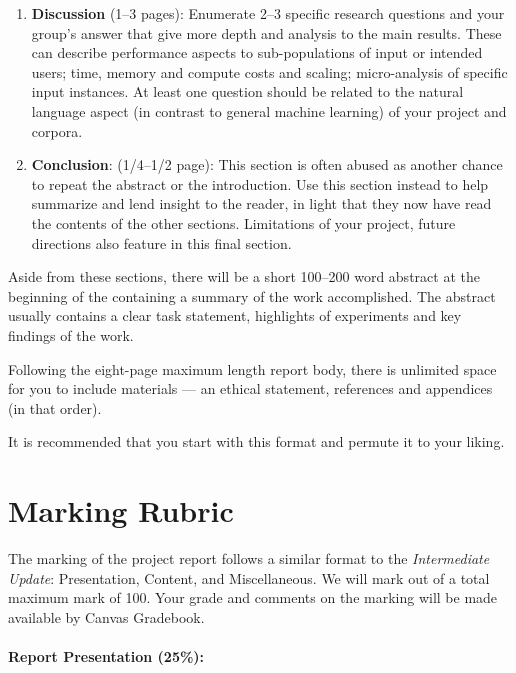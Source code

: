 \documentclass[11pt]{article}
\begin{document}
\begin{enumerate}
    \item {\bf Discussion} (1--3 pages): Enumerate 2--3 specific research questions and your group's answer that give more depth and analysis to the main results.  These can describe performance aspects to sub-populations of input or intended users; time, memory and compute costs and scaling; micro-analysis of specific input instances.  At least one question should be related to the natural language aspect (in contrast to general machine learning) of your project and corpora.
    \item {\bf Conclusion}: (1/4--1/2 page): This section is often abused as another chance to repeat the abstract or the introduction.  Use this section instead to help summarize and lend insight to the reader, in light that they now have read the contents of the other sections.  Limitations of your project, future directions also feature in this final section.
\end{enumerate}

\noindent Aside from these sections, there will be a short 100--200 word abstract at the beginning of the containing a summary of the work accomplished.  The abstract usually contains a clear task statement, highlights of experiments and key findings of the work.  

Following the eight-page maximum length report body, there is unlimited space for you to include materials --- an ethical statement, references and appendices (in that order). 

It is recommended that you start with this format and permute it to your liking.


\section{Marking Rubric}

The marking of the project report follows a similar format to the {\it Intermediate Update}: Presentation, Content, and Miscellaneous.  We will mark out of a total maximum mark of 100.  Your grade and comments on the marking will be made available by Canvas Gradebook.

\paragraph{Report Presentation (25\%):}
\end{document}
